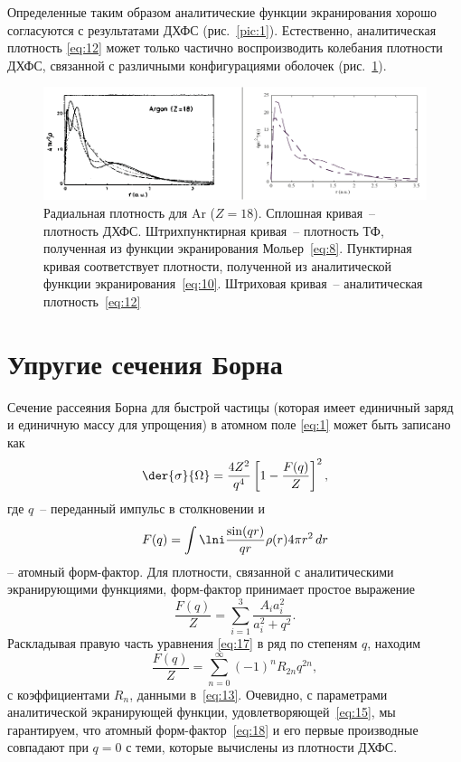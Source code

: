 \documentclass[10pt,pscyr]{hedlab}
\newcommand{\eq}  [1]{\eqref{eq:#1}}
\newcommand{\pic} [1]{\ref{pic:#1}}
\begin{document}
  Определенные таким образом аналитические функции экранирования хорошо
  согласуются с результатами ДХФС (рис.~\pic{1}). Естественно, аналитическая
  плотность \eq{12} может только частично воспроизводить колебания плотности
  ДХФС, связанной с различными конфигурациями оболочек (рис.~\pic{2}).
  
  \begin{figure}[htb!]
    \center
    \includegraphics[width=.7\textwidth]{pic_2}
    \caption{Радиальная плотность для Ar (\( Z = 18 \)). Сплошная кривая~--
      плотность ДХФС. Штрихпунктирная кривая~-- плотность ТФ, полученная из
      функции экранирования Мольер~\eq{8}. Пунктирная кривая соответствует
      плотности, полученной из аналитической функции экранирования~\eq{10}.
      Штриховая кривая~-- аналитическая плотность~\eq{12}}
    \label{pic:2}
  \end{figure}
  
  \section{Упругие сечения Борна}
  \label{sec:3}
  
  Сечение рассеяния Борна для быстрой частицы (которая имеет единичный заряд и
  единичную массу для упрощения) в атомном поле \eq{1} может быть записано как
  \begin{equation}
    \der{\sigma}{\Omega} = \frac{4Z^2}{q^4} \left[1 - \frac{F(q)}{Z}\right]^2,
    \label{eq:16}
  \end{equation}
  где \( q \)~-- переданный импульс в столкновении и
  \begin{equation}
    F(q) = \int\lni \frac{\sin(qr)}{qr} \rho(r) 4\pi r^2\,dr
    \label{eq:17}
  \end{equation}
  -- атомный форм-фактор. Для плотности, связанной с аналитическими
  экранирующими функциями, форм-фактор принимает простое выражение
  \begin{equation}
    \frac{F(q)}{Z} = \sum\limits_{i=1}^3 \frac{A_i a_i^2}{a_i^2 + q^2}.
    \label{eq:18}
  \end{equation}
  Раскладывая правую часть уравнения \eq{17} в ряд по степеням \( q \), находим
  \[
    \frac{F(q)}{Z} = \sum\limits_{n=0}^\infty (-1)^n R_{2n} q^{2n},
  \]
  с коэффициентами \( R_n \), данными в~\eq{13}. Очевидно, с параметрами
  аналитической экранирующей функции, удовлетворяющей~\eq{15}, мы гарантируем,
  что атомный форм-фактор~\eq{18} и его первые производные совпадают при
  \( q = 0 \) с теми, которые вычислены из плотности ДХФС.
  
\end{document}
